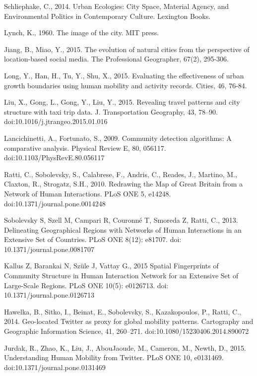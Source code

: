 \documentclass[10pt,letterpaper]{article}
\begin{document}
\begin{thebibliography}{10}
Schliephake, C., 2014. Urban Ecologies: City Space, Material Agency, and Environmental Politics in Contemporary Culture. Lexington Books.

Lynch, K., 1960. The image of the city. MIT press.

Jiang, B., Miao, Y., 2015. The evolution of natural cities from the perspective of location-based social media. The Professional Geographer, 67(2), 295-306.

Long, Y., Han, H., Tu, Y., Shu, X., 2015. Evaluating the effectiveness of urban growth boundaries using human mobility and activity records. Cities, 46, 76-84.

Liu, X., Gong, L., Gong, Y., Liu, Y., 2015. Revealing travel patterns and city structure with taxi trip data. J. Transportation Geography, 43, 78–90. doi:10.1016/j.jtrangeo.2015.01.016

Lancichinetti, A., Fortunato, S., 2009. Community detection algorithms: A comparative analysis. Physical Review E, 80, 056117. doi:10.1103/PhysRevE.80.056117

Ratti, C., Sobolevsky, S., Calabrese, F., Andris, C., Reades, J., Martino, M., Claxton, R., Strogatz, S.H., 2010. Redrawing the Map of Great Britain from a Network of Human Interactions. PLoS ONE 5, e14248. doi:10.1371/journal.pone.0014248

Sobolevsky S, Szell M, Campari R, Couronné T, Smoreda Z, Ratti, C., 2013. Delineating Geographical Regions with Networks of Human Interactions in an Extensive Set of Countries. PLoS ONE 8(12): e81707. doi: 10.1371/journal.pone.0081707

Kallus Z, Barankai N, Szüle J, Vattay G., 2015 Spatial Fingerprints of Community Structure in Human Interaction Network for an Extensive Set of Large-Scale Regions. PLoS ONE 10(5): e0126713. doi: 10.1371/journal.pone.0126713 

Hawelka, B., Sitko, I., Beinat, E., Sobolevsky, S., Kazakopoulos, P., Ratti, C., 2014. Geo-located Twitter as proxy for global mobility patterns. Cartography and Geographic Information Science, 41, 260–271. doi:10.1080/15230406.2014.890072

Jurdak, R., Zhao, K., Liu, J., AbouJaoude, M., Cameron, M., Newth, D., 2015. Understanding Human Mobility from Twitter. PLoS ONE 10, e0131469. doi:10.1371/journal.pone.0131469


\end{thebibliography}
\end{document}
